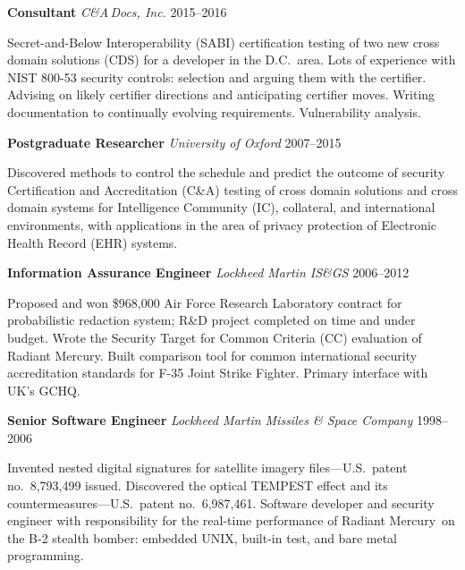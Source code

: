\vspace{3mm}
\noindent\textbf{Consultant}
    \hfill \emph{C\&A\,Docs, Inc.} \hfill 2015--2016

    \vspace{1mm}
    \noindent Secret-and-Below Interoperability (SABI) certification
    testing of two new cross domain solutions (CDS) for a developer in the
    D.C.\ area. Lots of experience with NIST 800-53 security controls:
    selection and arguing them with the certifier. Advising on likely certifier
    directions and anticipating certifier moves. Writing documentation to
    continually evolving requirements. Vulnerability analysis.

\vspace{2mm}
\noindent\textbf{Postgraduate Researcher}
    \hfill \emph{University of Oxford} \hfill 2007--2015

    \vspace{1mm}
    \noindent Discovered methods to control the schedule and predict the
    outcome of security Certification and Accreditation (C\&A)
    testing of cross domain solutions and cross domain systems for
    Intelligence Community (IC), collateral, and international
    environments, with applications in the area of privacy protection
    of Electronic Health Record (EHR) systems.

\vspace{2mm}
\noindent\textbf{Information Assurance Engineer}
    \hfill \emph{Lockheed Martin IS\&GS} \hfill 2006--2012

    \vspace{1mm}
    \noindent Proposed and won \$968,000 Air Force Research Laboratory
    contract for probabilistic redaction system; R\&D
    project completed on time and under budget. Wrote the
    Security Target for Common Criteria (CC) evaluation of Radiant
    Mercury\rmtrademark. Built comparison tool for common international
    security accreditation standards for F-35 Joint Strike Fighter.
    Primary interface with UK's GCHQ.

\vspace{2mm}
\noindent\textbf{Senior Software Engineer}
    \hfill \emph{Lockheed Martin Missiles \& Space Company} \hfill 1998--2006

    \vspace{1mm}
    \noindent Invented nested digital signatures for satellite imagery
    files---U.S.\ patent no.~8,793,499 issued. Discovered the
    optical TEMPEST effect and its countermeasures---U.S.\ patent
    no.~6,987,461. Software developer and security engineer with
    responsibility for the real-time performance of Radiant
    Mercury\rmtrademark\ on the B-2 stealth bomber: embedded UNIX, built-in
    test, and bare metal programming.

